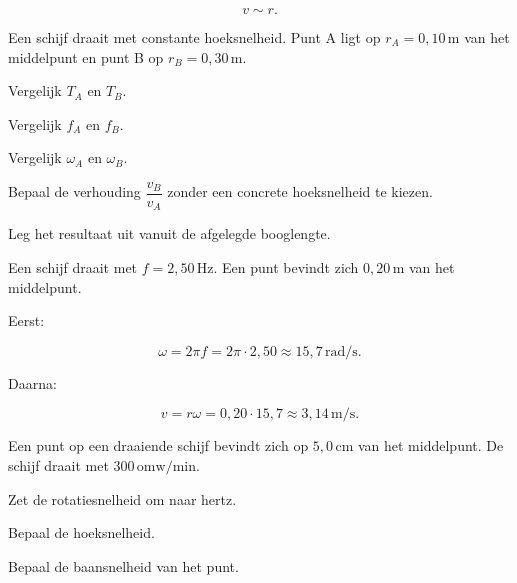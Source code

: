 \documentclass{ximera}
\begin{document}
\[
\boxed{v\sim r}.
\]


\begin{oefening}{\oefU\ESS}

Een schijf draait met constante hoeksnelheid. Punt A ligt op
$r_A=0,10\,\mathrm{m}$ van het middelpunt en punt B op
$r_B=0,30\,\mathrm{m}$.

\begin{question}
Vergelijk $T_A$ en $T_B$.
\end{question}

\begin{question}
Vergelijk $f_A$ en $f_B$.
\end{question}

\begin{question}
Vergelijk $\omega_A$ en $\omega_B$.
\end{question}

\begin{question}
Bepaal de verhouding $\dfrac{v_B}{v_A}$ zonder een concrete
hoeksnelheid te kiezen.
\end{question}

\begin{question}
Leg het resultaat uit vanuit de afgelegde booglengte.
\end{question}

\end{oefening}


\begin{voorbeeld}

Een schijf draait met $f=2,50\,\mathrm{Hz}$. Een punt bevindt zich
$0,20\,\mathrm{m}$ van het middelpunt.

Eerst:

\[
\omega=2\pi f
=2\pi\cdot2,50
\approx15,7\,\mathrm{rad/s}.
\]

Daarna:

\[
v=r\omega
=0,20\cdot15,7
\approx3,14\,\mathrm{m/s}.
\]

\end{voorbeeld}


\begin{oefening}[CD-speler]{\oefB}

Een punt op een draaiende schijf bevindt zich op
$5,0\,\mathrm{cm}$ van het middelpunt. De schijf draait met
$300\,\mathrm{omw/min}$.

\begin{question}
Zet de rotatiesnelheid om naar hertz.
\end{question}

\begin{question}
Bepaal de hoeksnelheid.
\end{question}

\begin{question}
Bepaal de baansnelheid van het punt.
\end{question}

\end{oefening}
\end{document}
